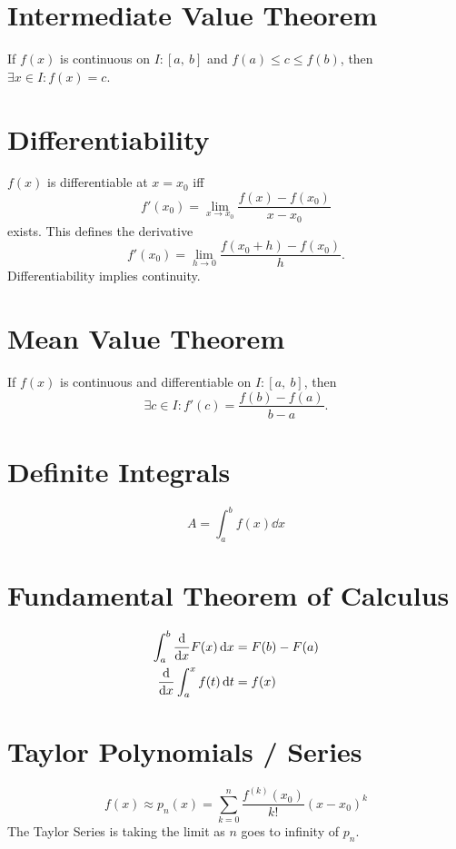 \documentclass{article}
\begin{document}
\begin{multicols}{3}
    \section*{Intermediate Value Theorem}
    If \(f(x)\) is continuous on \(I:\left[ a, \: b \right]\) and \(f(a) \leq c \leq f(b)\), then \(\exists x\in I:f(x)=c\).
    \section*{Differentiability}
    \(f(x)\) is differentiable at \(x=x_0\) iff
    \begin{equation*}
        f'(x_0) = \lim_{x\to x_0} \frac{f(x)-f(x_0)}{x-x_0}
    \end{equation*}
    exists. This defines the derivative
    \begin{equation*}
        f'(x_0) = \lim_{h\to 0} \frac{f(x_0+h)-f(x_0)}{h}.
    \end{equation*}
    Differentiability implies continuity.
    \section*{Mean Value Theorem}
    If \(f(x)\) is continuous and differentiable on \(I:\left[ a,\:b \right]\), then
    \begin{equation*}
        \exists c\in I:f'(c)=\frac{f(b)-f(a)}{b-a}.
    \end{equation*}
    \section*{Definite Integrals}
    \begin{equation*}
        A = \int_a^b f(x) \dd{x}
    \end{equation*}
    \section*{Fundamental Theorem of Calculus}
    \begin{align*}
        \int_a^b \dv{x}F(x) \dd{x} & = F(b) - F(a) \\
        \dv{x}\int_a^x f(t) \dd{t} & = f(x)
    \end{align*}
    \section*{Taylor Polynomials / Series}
    \begin{equation*}
        f(x) \approx p_n(x) = \sum_{k=0}^n \frac{f^{\left( k \right)}(x_0)}{k!} \left( x-x_0 \right)^k
    \end{equation*}
    The Taylor Series is taking the limit as \(n\) goes to infinity of \(p_n\).


\end{multicols}
\end{document}
